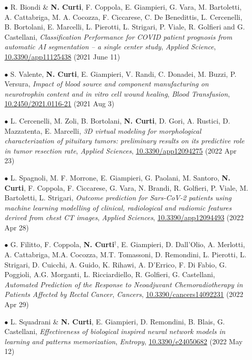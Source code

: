 \documentclass[a4paper,11pt]{article}
\begin{document}
\begin{itemize}
  \item[$\bullet$] R. Biondi \& \textbf{N. Curti}, F. Coppola, E. Giampieri, G. Vara, M. Bartoletti, A. Cattabriga, M. A. Cocozza, F. Ciccarese, C. De Benedittis, L. Cercenelli, B. Bortolani, E. Marcelli, L. Pierotti, L. Strigari, P. Viale, R. Golfieri and G. Castellani, \emph{Classification Performance for COVID patient prognosis from automatic AI segmentation – a single center study}, \emph{Applied Science}, \url{10.3390/app11125438} (2021 June 11)

  \item[$\bullet$] S. Valente, \textbf{N. Curti}, E. Giampieri, V. Randi, C. Donadei, M. Buzzi, P. Versura, \emph{Impact of blood source and component manufacturing on neurotrophin content and in vitro cell wound healing}, \emph{Blood Transfusion}, \url{10.2450/2021.0116-21} (2021 Aug 3)

  \item[$\bullet$] L. Cercenelli, M. Zoli, B. Bortolani, \textbf{N. Curti}, D. Gori, A. Rustici, D. Mazzatenta, E. Marcelli, \emph{3D virtual modeling for morphological characterization of pituitary tumors: preliminary results on its predictive role in tumor resection rate}, \emph{Applied Sciences}, \url{10.3390/app12094275} (2022 Apr 23)

  \item[$\bullet$] L. Spagnoli, M. F. Morrone, E. Giampieri, G. Paolani, M. Santoro, \textbf{N. Curti}, F. Coppola, F. Ciccarese, G. Vara, N. Brandi, R. Golfieri, P. Viale, M. Bartoletti, L. Strigari, \emph{Outcome prediction for Sars-CoV-2 patients using machine learning modelling of clinical, radiological and radiomic features derived from chest CT images}, \emph{Applied Sciences}, \url{10.3390/app12094493} (2022 Apr 28)

  \item[$\bullet$] G. Filitto, F. Coppola, \textbf{N. Curti$^\dagger$}, E. Giampieri, D. Dall’Olio, A. Merlotti, A. Cattabriga, M.A. Cocozza, M.T. Tomassoni, D. Remondini, L. Pierotti, L. Strigari, D. Cuicchi, A. Guido, K. Rihawi, A. D'Errico, F. Di Fabio, G. Poggioli, A.G. Morganti, L. Ricciardiello, R. Golfieri, G. Castellani, \emph{Automated Prediction of the Response to Neoadjuvant Chemoradiotherapy in Patients Affected by Rectal Cancer}, \emph{Cancers}, \url{10.3390/cancers14092231} (2022 Apr 29)

  \item[$\bullet$] L. Squadrani \& \textbf{N. Curti}, E. Giampieri, D. Remondini, B. Blais, G. Castellani, \emph{Effectiveness of biological inspired neural network models in learning and patterns memorization}, \emph{Entropy}, \url{10.3390/e24050682} (2022 May 12)


\end{itemize}
\end{document}
